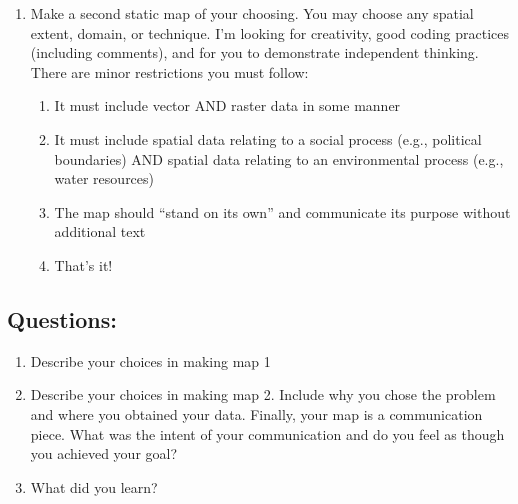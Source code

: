 \documentclass[]{article}
\providecommand{\tightlist}{%
  \setlength{\itemsep}{0pt}\setlength{\parskip}{0pt}}
\begin{document}
\begin{enumerate}
\def\labelenumi{\arabic{enumi}.}
\setcounter{enumi}{1}
\tightlist
\item
  Make a second static map of your choosing. You may choose any spatial
  extent, domain, or technique. I'm looking for creativity, good coding
  practices (including comments), and for you to demonstrate independent
  thinking. There are minor restrictions you must follow:

  \begin{enumerate}
  \def\labelenumii{\arabic{enumii}.}
  \tightlist
  \item
    It must include vector AND raster data in some manner
  \item
    It must include spatial data relating to a social process (e.g.,
    political boundaries) AND spatial data relating to an environmental
    process (e.g., water resources)
  \item
    The map should ``stand on its own'' and communicate its purpose
    without additional text
  \item
    That's it!
  \end{enumerate}
\end{enumerate}

\hypertarget{questions}{%
\subsection{Questions:}\label{questions}}

\begin{enumerate}
\def\labelenumi{\arabic{enumi}.}
\item
  Describe your choices in making map 1
\item
  Describe your choices in making map 2. Include why you chose the
  problem and where you obtained your data. Finally, your map is a
  communication piece. What was the intent of your communication and do
  you feel as though you achieved your goal?
\item
  What did you learn?
\end{enumerate}
\end{document}
